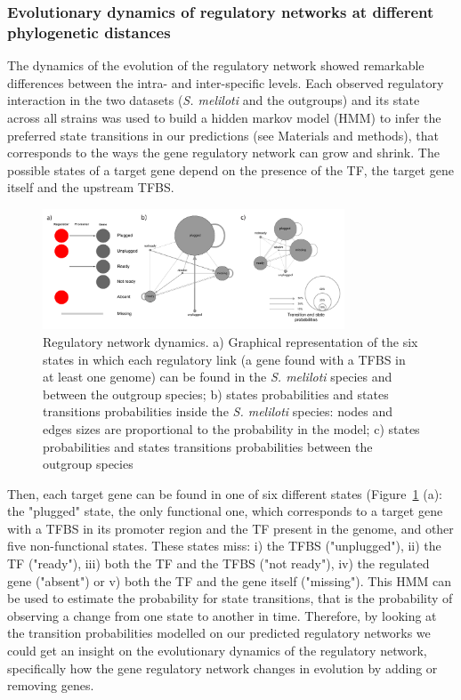 \subsubsection{Evolutionary dynamics of regulatory networks at different phylogenetic distances}
The dynamics of the evolution of the regulatory network showed remarkable differences between the intra- and inter-specific levels.
Each observed regulatory interaction in the two datasets (\textit{S. meliloti} and the outgroups) and its state across all strains was used to build a hidden markov model (HMM) to infer the preferred state transitions in our predictions (see Materials and methods), that corresponds to the ways the gene regulatory network can grow and shrink.
The possible states of a target gene depend on the presence of the TF, the target gene itself and the upstream TFBS. %
\begin{figure}[!tb]
	\centering
	\includegraphics[width=0.8\textwidth]{./figures/Appendix_1/4_reg}
  	\caption{\label{fig:reg4} Regulatory network dynamics. a) Graphical representation of the six states in which each regulatory link (a gene found with a TFBS in at least one genome) can be found in the \textit{S. meliloti} species and between the outgroup species; b) states probabilities and states transitions probabilities inside the \textit{S. meliloti} species: nodes and edges sizes are proportional to the probability in the model; c) states probabilities and states transitions probabilities between the outgroup species}
\end{figure}%
 Then, each target gene can be found in one of six different states (Figure~\ref{fig:reg4} (a): the "plugged" state, the only functional one, which corresponds to a target gene with a TFBS in its promoter region and the TF present in the genome, and other five non-functional states.
 These states miss: i) the TFBS ("unplugged"), ii) the TF ("ready"), iii) both the TF and the TFBS ("not ready"), iv) the regulated gene ("absent") or v) both the TF and the gene itself ("missing").
This HMM can be used to estimate the probability for state transitions, that is the probability of observing a change from one state to another in time.
 Therefore, by looking at the transition probabilities modelled on our predicted regulatory networks we could get an insight on the evolutionary dynamics of the regulatory network, specifically how the gene regulatory network changes in evolution by adding or removing genes.

